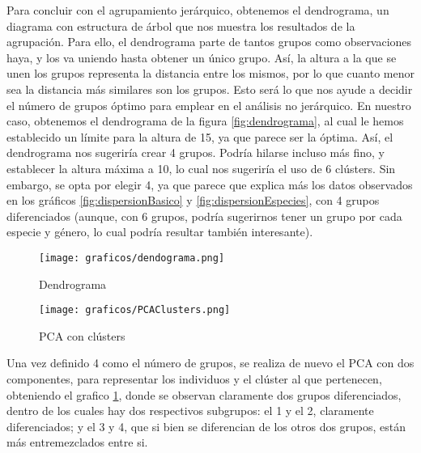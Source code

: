 \documentclass[a4paper,onecolumn]{extarticle}
\begin{document}
\begin{sloppypar}
Para concluir con el agrupamiento jerárquico, obtenemos el dendrograma, un diagrama con estructura de árbol que nos muestra los resultados de la agrupación. 
Para ello, el dendrograma parte de tantos grupos como observaciones haya, y los va uniendo hasta obtener un único grupo. Así, la altura a la que se unen los 
grupos representa la distancia entre los mismos, por lo que cuanto menor sea la distancia más similares son los grupos. Esto será lo que nos ayude a decidir 
el número de grupos óptimo para emplear en el análisis no jerárquico. En nuestro caso, obtenemos el dendrograma de la figura \ref{fig:dendrograma}, al cual le 
hemos establecido un límite para la altura de 15, ya que parece ser la óptima. Así, el dendrograma nos sugeriría crear 4 grupos. Podría hilarse incluso más 
fino, y establecer la altura máxima a 10, lo cual nos sugeriría el uso de 6 clústers. Sin embargo, se opta por elegir 4, ya que parece que explica más los 
datos observados en los gráficos \ref{fig:dispersionBasico} y \ref{fig:dispersionEspecies}, con 4 grupos diferenciados (aunque, con 6 grupos, podría sugerirnos 
tener un grupo por cada especie y género, lo cual podría resultar también interesante).
\begin{center}
    \begin{figure}[h!]
        \centering
        \begin{minipage}{0.45\textwidth}
            \centering
            \texttt{[image: graficos/dendograma.png]}
            \caption{Dendrograma}
            \label{fig:dendrograma}
        \end{minipage}
        \hspace{0.005\textwidth} %
        \begin{minipage}{0.5\textwidth}
            \centering
            \texttt{[image: graficos/PCAClusters.png]}
            \caption{PCA con clústers}
            \label{fig:PCACluster}
        \end{minipage}
    \end{figure}
\end{center}

Una vez definido 4 como el número de grupos, se realiza de nuevo el PCA con dos componentes, para representar los individuos y el clúster al que pertenecen,
obteniendo el grafico \ref{fig:PCACluster}, donde se observan claramente dos grupos diferenciados, dentro de los cuales hay dos respectivos subgrupos: el 1 y el 2,
claramente diferenciados; y el 3 y 4, que si bien se diferencian de los otros dos grupos, están más entremezclados entre si.


\end{sloppypar}
\end{document}
